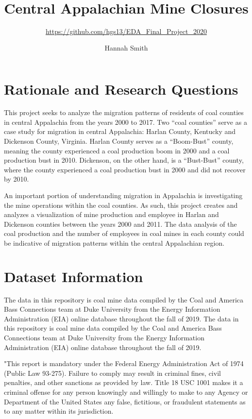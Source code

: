 \documentclass[12pt,]{article}
\title{Central Appalachian Mine Closures}
\subtitle{\url{https://github.com/hgs13/EDA_Final_Project_2020}}
\author{Hannah Smith}
\date{}
\begin{document}
\maketitle

\newpage
\tableofcontents 
\newpage
\listoftables 
\newpage
\listoffigures 
\newpage

\hypertarget{rationale-and-research-questions}{%
\section{Rationale and Research
Questions}\label{rationale-and-research-questions}}

This project seeks to analyze the migration patterns of residents of
coal counties in central Appalachia from the years 2000 to 2017. Two
``coal counties'' serve as a case study for migration in central
Appalachia: Harlan County, Kentucky and Dickenson County, Virginia.
Harlan County serves as a ``Boom-Bust'' county, meaning the county
experienced a coal production boom in 2000 and a coal production bust in
2010. Dickenson, on the other hand, is a ``Bust-Bust'' county, where the
county experienced a coal production bust in 2000 and did not recover by
2010.

An important portion of understanding migration in Appalachia is
investigating the mine operations within the coal counties. As such,
this project creates and analyzes a visualization of mine production and
employee in Harlan and Dickenson counties between the years 2000 and
2011. The data analysis of the coal production and the number of
employees in coal mines in each county could be indicative of migration
patterns within the central Appalachian region.

\newpage

\hypertarget{dataset-information}{%
\section{Dataset Information}\label{dataset-information}}

The data in this repository is coal mine data compiled by the Coal and
America Bass Connections team at Duke University from the Energy
Information Administration (EIA) online database throughout the fall of
2019. The data in this repository is coal mine data compiled by the Coal
and America Bass Connections team at Duke University from the Energy
Information Administration (EIA) online database throughout the fall of
2019.

"This report is mandatory under the Federal Energy Administration Act of
1974 (Public Law 93-275). Failure to comply may result in criminal
fines, civil penalties, and other sanctions as provided by law. Title 18
USC 1001 makes it a criminal offense for any person knowingly and
willingly to make to any Agency or Department of the United States any
false, fictitious, or fraudulent statements as to any matter within its
jurisdiction.
\end{document}
